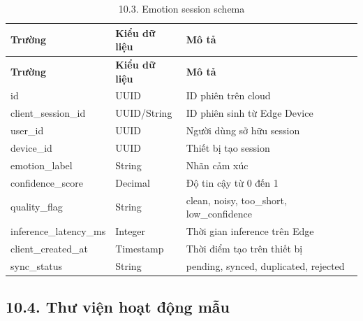 \documentclass[12pt,a4paper]{article}
\begin{document}
\begin{center}
\begin{longtable}{|P{0.25\textwidth}|P{0.32\textwidth}|P{0.33\textwidth}|}
\caption{10.3. Emotion session schema}\\
\hline
\textbf{Trường} & \textbf{Kiểu dữ liệu} & \textbf{Mô tả} \\
\hline
\endfirsthead
\hline
\textbf{Trường} & \textbf{Kiểu dữ liệu} & \textbf{Mô tả} \\
\hline
\endhead
id & UUID & ID phiên trên cloud \\
\hline
client\_session\_id & UUID/String & ID phiên sinh từ Edge Device \\
\hline
user\_id & UUID & Người dùng sở hữu session \\
\hline
device\_id & UUID & Thiết bị tạo session \\
\hline
emotion\_label & String & Nhãn cảm xúc \\
\hline
confidence\_score & Decimal & Độ tin cậy từ 0 đến 1 \\
\hline
quality\_flag & String & clean, noisy, too\_short, low\_confidence \\
\hline
inference\_latency\_ms & Integer & Thời gian inference trên Edge \\
\hline
client\_created\_at & Timestamp & Thời điểm tạo trên thiết bị \\
\hline
sync\_status & String & pending, synced, duplicated, rejected \\
\hline
\end{longtable}
\end{center}

\subsection*{10.4. Thư viện hoạt động mẫu}
\end{document}
